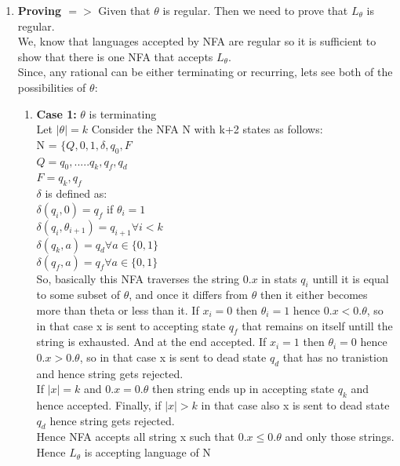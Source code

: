 \documentclass{article}
\begin{document}
\begin{enumerate}
    \item \textbf{Proving $=>$}
        Given that $\theta $ is regular. Then we need to prove that $L_{\theta}$ is regular.\\
        We, know that languages accepted by NFA are regular so it is sufficient to show that there is one NFA that accepts $L_{\theta}$.\\
        Since, any rational can be either terminating or recurring, lets see both of the possibilities of  $\theta $:
        \begin{enumerate}
            \item \textbf{Case 1: } $\theta $ is terminating\\
            
            Let $|\theta| = k$
            Consider the NFA N with k+2 states as follows: \\
            N = $\{Q,{0,1},\delta,q_0,F $\\
            $Q = {q_0,.....q_k,q_f,q_d}$\\
            $F = {q_k,q_f}$\\   
            $\delta$ is defined as:\\
            $\delta(q_i,0) = q_f $ if $\theta_i = 1$\\
            $\delta(q_i,\theta_{i+1}) = q_{i+1} \forall i < k$\\
            $\delta(q_k,a) = q_d \forall a \in \{0,1\}$\\
            $\delta(q_f,a) = q_f \forall a \in \{0,1\}$\\

            So, basically this NFA traverses the string $0.x$ in stats $q_i$ untill it is equal to some subset of $\theta$, and once it differs from $\theta$ then it either
            becomes more than theta or less than it. If $x_i = 0$ then $\theta_i = 1$ hence $0.x < 0.\theta$, so in that case x is sent to accepting state $q_f$ that remains on itself untill the string is exhausted.
            And at the end accepted. If $x_i = 1$ then $\theta_i = 0$ hence $0.x > 0.\theta$, so in that case x is sent to dead state $q_d$ that has no tranistion and hence string gets rejected. \\
            If $|x| = k$ and $0.x = 0.\theta$ then string ends up in accepting state $q_k$ and hence accepted.
            Finally, if $|x| > k$ in that case also x is sent to dead state $q_d$ hence string gets rejected. \\
            Hence NFA accepts all string x such that $0.x \leq 0.\theta$ and only those strings.\\
            Hence $L_{\theta}$ is accepting language of N\\



\end{enumerate}
\end{enumerate}
\end{document}
